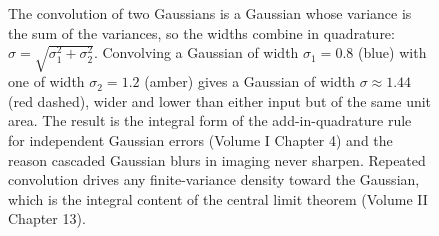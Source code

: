 \begin{figure}[htbp]
\centering
{}
\caption[Convolution of two Gaussians]{The convolution of two
Gaussians is a Gaussian whose variance is the sum of the variances, so
the widths combine in quadrature: $\sigma = \sqrt{\sigma_{1}^{2} +
\sigma_{2}^{2}}$. Convolving a Gaussian of width $\sigma_{1} = 0.8$
(blue) with one of width $\sigma_{2} = 1.2$ (amber) gives a Gaussian
of width $\sigma \approx 1.44$ (red dashed), wider and lower than
either input but of the same unit area. The result is the integral
form of the add-in-quadrature rule for independent Gaussian errors
(Volume I Chapter 4) and the reason cascaded Gaussian blurs in imaging
never sharpen. Repeated convolution drives any finite-variance density
toward the Gaussian, which is the integral content of the central
limit theorem (Volume II Chapter 13).}
\label{fig:vol02:ch06:gaussian-convolution}
\end{figure}

